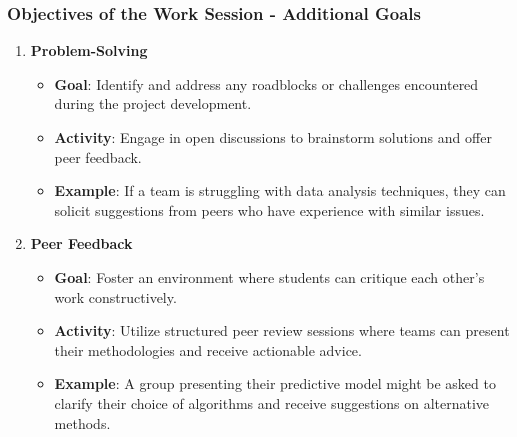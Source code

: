 \documentclass{beamer}
\begin{document}
\begin{frame}[fragile]
    \frametitle{Objectives of the Work Session - Additional Goals}
    \begin{enumerate}[resume]
        \item \textbf{Problem-Solving}
        \begin{itemize}
            \item \textbf{Goal}: Identify and address any roadblocks or challenges encountered during the project development.
            \item \textbf{Activity}: Engage in open discussions to brainstorm solutions and offer peer feedback.
            \item \textbf{Example}: If a team is struggling with data analysis techniques, they can solicit suggestions from peers who have experience with similar issues.
        \end{itemize}
        
        \item \textbf{Peer Feedback}
        \begin{itemize}
            \item \textbf{Goal}: Foster an environment where students can critique each other's work constructively.
            \item \textbf{Activity}: Utilize structured peer review sessions where teams can present their methodologies and receive actionable advice.
            \item \textbf{Example}: A group presenting their predictive model might be asked to clarify their choice of algorithms and receive suggestions on alternative methods.
        \end{itemize}
    \end{enumerate}
\end{frame}
\end{document}
